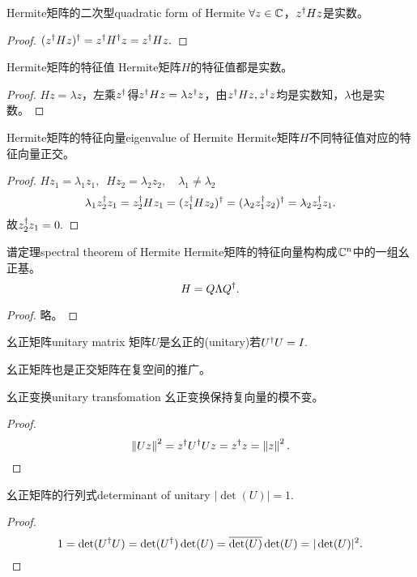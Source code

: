 \begin{theorem}{Hermite矩阵的二次型}{quadratic form of Hermite}
	$\forall z\in\mathbb C$，$z^\dagger Hz$是实数。
\end{theorem}
\begin{proof}
	$(z^\dagger Hz)^\dagger=z^\dagger H^\dagger z=z^\dagger Hz.$
\end{proof}
\begin{theorem}{Hermite矩阵的特征值}{}
	Hermite矩阵$H$的特征值都是实数。
\end{theorem}
\begin{proof}
	$Hz=\lambda z$，左乘$z^\dagger$得$z^\dagger Hz=\lambda z^\dagger z$，由$z^\dagger Hz,z^\dagger z$均是实数知，$\lambda$也是实数。
\end{proof}
\begin{theorem}{Hermite矩阵的特征向量}{eigenvalue of Hermite}
	Hermite矩阵$H$不同特征值对应的特征向量正交。
\end{theorem}
\begin{proof}
	$Hz_1=\lambda_1z_1,\enspace Hz_2=\lambda_2z_2,\quad\lambda_1\neq\lambda_2$
	\[
		\lambda_1z_2^\dagger z_1=z_2^\dagger Hz_1=(z_1^\dagger Hz_2)^\dagger=(\lambda_2z_1^\dagger z_2)^\dagger=\lambda_2z_2^\dagger z_1.
	\]
	故$z_2^\dagger z_1=0.$
\end{proof}
\begin{theorem}{谱定理}{spectral theorem of Hermite}
	Hermite矩阵的特征向量构构成$\mathbb C^n$中的一组幺正基。
	\[
		H=Q\Lambda Q^\dagger.
	\]
\end{theorem}
\begin{proof}
	略。
\end{proof}
\begin{definition}{幺正矩阵}{unitary matrix}
	矩阵$U$是幺正的(unitary)若$U^\dagger U=I.$
\end{definition}
幺正矩阵也是正交矩阵在复空间的推广。
\begin{theorem}{幺正变换}{unitary transfomation}
	幺正变换保持复向量的模不变。
\end{theorem}
\begin{proof}
	\[
		\left\lVert Uz\right\rVert^2=z^\dagger U^\dagger Uz=z^\dagger z=\left\lVert z\right\rVert^2.
		\qedhere
	\]
\end{proof}
\begin{theorem}{幺正矩阵的行列式}{determinant of unitary}
	$|\det(U)|=1.$
\end{theorem}
\begin{proof}
	\[
		1=\det(U^\dagger U)=\det(U^\dagger)\det(U)=\overline{\det(U)}\det(U)=|\det(U)|^2.
		\qedhere
	\]
\end{proof}

